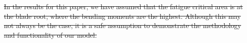\documentclass[11pt,letterpaper]{article}
\providecommand{\DIFdel}[1]{{\protect\color{red}\sout{#1}}}                      %
\providecommand{\DIFdelbegin}{} %
\providecommand{\DIFdelend}{} %
\newcommand{\DIFscaledelfig}{0.5}
\newlength{\DIFdelgraphicswidth} %
\newlength{\DIFdelgraphicsheight} %
\newcommand{\DIFdelincludegraphics}[2][]{%
\sbox{\DIFdelgraphicsbox}{\DIFOincludegraphics[#1]{#2}}%
\settoboxwidth{\DIFdelgraphicswidth}{\DIFdelgraphicsbox} %
\settoboxtotalheight{\DIFdelgraphicsheight}{\DIFdelgraphicsbox} %
\scalebox{\DIFscaledelfig}{%
\parbox[b]{\DIFdelgraphicswidth}{\usebox{\DIFdelgraphicsbox}\\[-\baselineskip] \rule{\DIFdelgraphicswidth}{0em}}\llap{\resizebox{\DIFdelgraphicswidth}{\DIFdelgraphicsheight}{%
\setlength{\unitlength}{\DIFdelgraphicswidth}%
\begin{picture}(1,1)%
\thicklines\linethickness{2pt} %
{\color[rgb]{1,0,0}\put(0,0){\framebox(1,1){}}}%
{\color[rgb]{1,0,0}\put(0,0){\line( 1,1){1}}}%
{\color[rgb]{1,0,0}\put(0,1){\line(1,-1){1}}}%
\end{picture}%
}\hspace*{3pt}}} %
} %
\DeclareRobustCommand{\DIFdelbegin}{\DIFOdelbegin \let\includegraphics\DIFdelincludegraphics} %
\DeclareRobustCommand{\DIFdelend}{\DIFOaddend \let\includegraphics\DIFOincludegraphics} %
\begin{document}
\DIFdelbegin \DIFdel{In the results for this paper, we have assumed that the fatigue critical area is at the blade root, where the bending moments are the highest. Although this may not always be the case, it is a safe assumption to demonstrate the methodology and functionality of our model.
}\DIFdelend %
\end{document}
